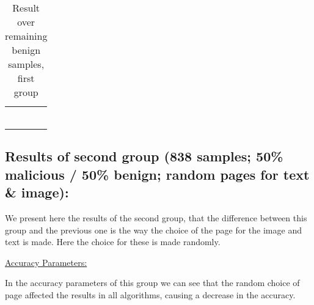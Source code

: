 \documentclass{article}
\begin{document}
\clearpage
\newpage

\begin{table}[htb]
\centering
\begin{tabular}{|M{4.0cm}|M{2.0cm}|M{2.0cm}|M{2.0cm}|}
	\hline
	\centering{} &  &  & \tabularnewline
	\hline
	 &  &  &  \tabularnewline
	\hline
	 &  &  & \tabularnewline
	\hline
	 &  &  & \tabularnewline
	\hline
	 &  &  & \tabularnewline
	\hline
	 &  &  & \tabularnewline
	\hline
	 &  &  & \tabularnewline
	\hline
\end{tabular}
\caption{Result over remaining benign samples, first group}
\end{table}

\subsection{Results of second group (838 samples; 50\% malicious / 50\% benign; random pages for text \& image):}
\indent We present here the results of the second group, that the difference between this group and the previous one is the way the choice of the page for the image and text is made. Here the choice for these is made randomly.

\noindent\underline{Accuracy Parameters:}

\indent	In the accuracy parameters of this group we can see that the random choice of page affected the results in all algorithms, causing a decrease in the accuracy.
\end{document}
